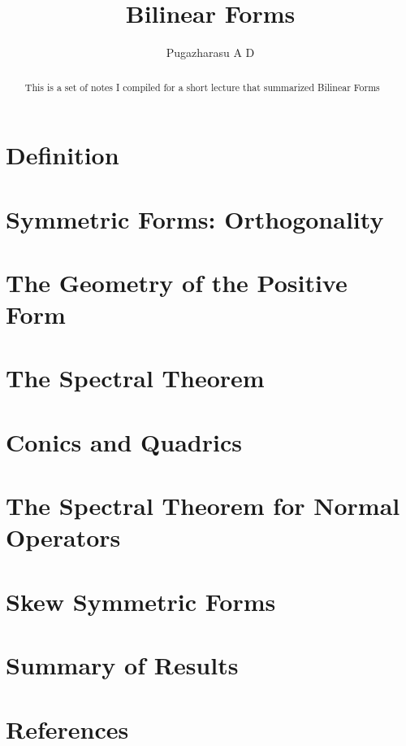 \documentclass[]{article}
\title{Bilinear Forms}
\author{Pugazharasu A D}
\begin{document}
\maketitle

\begin{abstract}
This is a set of notes I compiled for a short lecture that summarized Bilinear Forms
\end{abstract}
\section{Definition}
\section{Symmetric Forms: Orthogonality}
\section{The Geometry of the Positive Form}
\section{The Spectral Theorem}
\section{Conics and Quadrics}
\section{The Spectral Theorem for Normal Operators}
\section{Skew Symmetric Forms}
\section{Summary of Results}
\section*{References}
\end{document}
